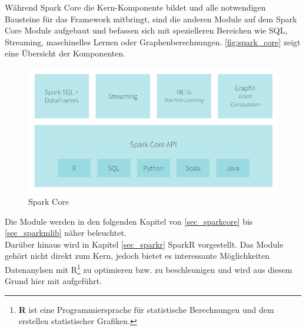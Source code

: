 \noindent
Während Spark Core die Kern-Komponente bildet und alle notwendigen Bausteine für das Framework mitbringt, sind die anderen Module auf dem Spark Core Module aufgebaut und befassen sich mit spezielleren Bereichen wie SQL, Streaming, maschinelles Lernen oder Graphenberechnungen. \autoref{fig:spark_core} zeigt eine Übersicht der Komponenten. \\

\begin{figure}[h]
  \centering
  \includegraphics[width=\textwidth]{./bilder/spark_core.png}
  \caption{Spark Core}\label{fig:spark_core}
\end{figure}


\noindent
Die Module werden in den folgenden Kapitel von \ref{sec_sparkcore} bis \ref{sec_sparkmlib} näher beleuchtet. \\

\noindent
Darüber hinaus wird in Kapitel \ref{sec_sparkr} SparkR vorgestellt. Das Module gehört nicht direkt zum Kern, jedoch bietet es interessante Möglichkeiten Datenanylsen mit R\footnote{\textbf{R} ist eine Programmiersprache für statistische Berechnungen und dem erstellen statistischer Grafiken. } zu optimieren bzw. zu beschleunigen und wird aus diesem Grund hier mit aufgeführt.











\newpage

